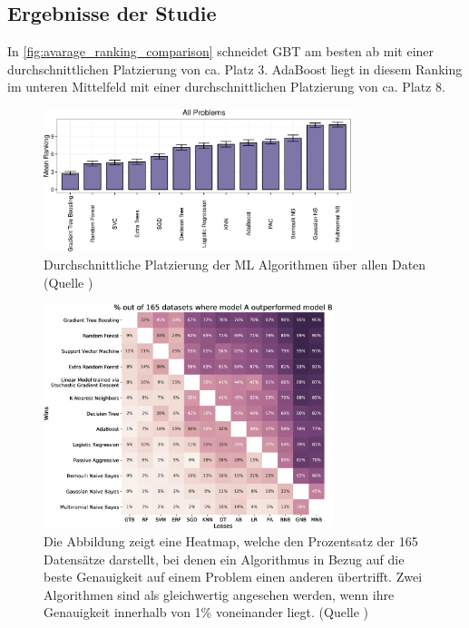 \subsection{Ergebnisse der Studie}
In \autoref{fig:avarage_ranking_comparison} schneidet GBT am besten ab mit einer durchschnittlichen Platzierung von ca. Platz 3. AdaBoost liegt in diesem Ranking im unteren Mittelfeld mit einer durchschnittlichen Platzierung von ca. Platz 8.
\begin{figure}[H]
    \centering
    \includegraphics[width=0.8\textwidth]{Images/avarageRankingComparison.png}
    \caption[Durchschnittliche Platzierung der ML Algorithmen über allen Daten]{Durchschnittliche Platzierung der ML Algorithmen über allen Daten (Quelle \cite[Abbildung 1]{Olson2018})}
    \label{fig:avarage_ranking_comparison}
\end{figure}
\begin{figure}[H]
    \centering
    \includegraphics[width=0.75\textwidth]{Images/heat_map_comparison.png}
    \caption[Heatmap zum 1 zu 1 Vergleich der Algorithmen]{Die Abbildung  zeigt eine Heatmap, welche den Prozentsatz der 165 Datensätze darstellt, bei denen ein Algorithmus in Bezug auf die beste Genauigkeit auf einem Problem einen anderen übertrifft. Zwei Algorithmen sind als gleichwertig angesehen werden, wenn ihre Genauigkeit innerhalb von 1\% voneinander liegt. (Quelle \cite[Abbildung 2]{Olson2018})}
    \label{fig:heat_map_comparisom}
\end{figure}

